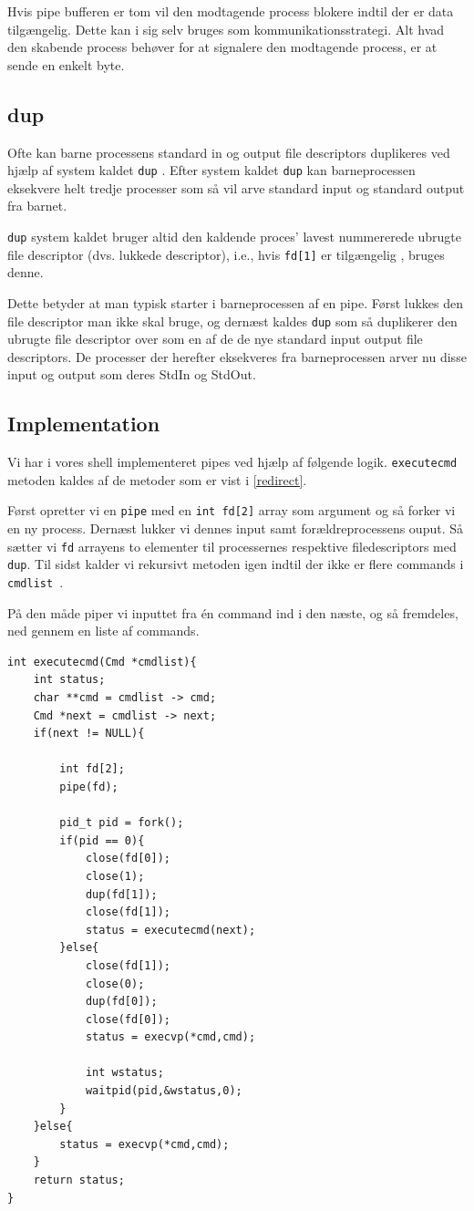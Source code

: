 \documentclass[danish]{report}
\begin{document}
Hvis pipe bufferen er tom vil den modtagende process blokere indtil der er data tilgængelig. Dette kan i sig selv bruges som kommunikationsstrategi. Alt hvad den skabende process behøver for at signalere den modtagende process, er at sende en enkelt byte.

\subsection{dup}
Ofte kan barne processens standard in og output file descriptors duplikeres ved hjælp af system kaldet {\tt dup} . Efter system kaldet {\tt dup} kan barneprocessen eksekvere helt tredje processer som så vil arve standard input og standard output fra barnet. 

{\tt dup} system kaldet bruger altid den kaldende proces' lavest nummererede ubrugte file descriptor (dvs. lukkede descriptor), i.e., hvis {\tt fd[1]} er tilgængelig , bruges denne.

Dette betyder at man typisk starter i barneprocessen af en pipe. Først lukkes den file descriptor man ikke skal bruge, og dernæst kaldes {\tt dup} som så duplikerer den ubrugte file descriptor over som en af de de nye standard input  output file descriptors. De processer der herefter eksekveres fra barneprocessen arver nu disse input og output som deres StdIn og StdOut.


\subsection{Implementation}
Vi har i vores shell implementeret pipes ved hjælp af følgende logik. {\tt executecmd} metoden kaldes af de metoder som er vist i \ref{redirect}.

Først opretter vi en {\tt pipe} med en {\tt int fd[2]} array som argument og så forker vi en ny process. Dernæst lukker vi dennes input samt forældreprocessens ouput. Så sætter vi {\tt fd} arrayens to elementer til processernes respektive filedescriptors med {\tt dup}. Til sidst kalder vi rekursivt metoden igen indtil der ikke er flere commands i {\tt cmdlist }. 

På den måde piper vi inputtet fra én command ind i den næste, og så fremdeles, ned gennem en liste  af commands. 


\begin{lstlisting}
int executecmd(Cmd *cmdlist){
    int status;
    char **cmd = cmdlist -> cmd;
    Cmd *next = cmdlist -> next;
    if(next != NULL){

        int fd[2];
        pipe(fd);

        pid_t pid = fork();
        if(pid == 0){
            close(fd[0]);
            close(1);
            dup(fd[1]);
            close(fd[1]);
            status = executecmd(next);
        }else{
            close(fd[1]);
            close(0);
            dup(fd[0]);
            close(fd[0]);
            status = execvp(*cmd,cmd);
            
            int wstatus;
            waitpid(pid,&wstatus,0);
        }
    }else{
        status = execvp(*cmd,cmd);
    }
    return status;
}

\end{lstlisting}
\end{document}
